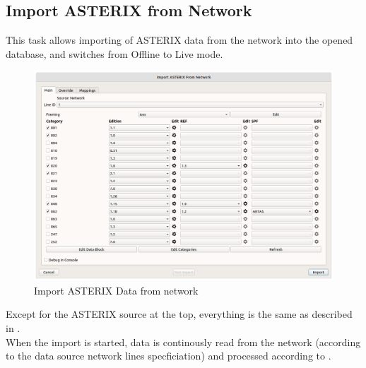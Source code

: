 \subsection{Import ASTERIX from Network}
\label{sec:ui_import_asterix_network}

This task allows importing of ASTERIX data from the network into the opened database, and switches from Offline to Live mode. \\

\begin{figure}[H]
  \center
    \hspace*{-0.5cm}
    \includegraphics[width=17cm]{figures/asterix_import_data_network.png}
  \caption{Import ASTERIX Data from network}
\end{figure}

Except for the ASTERIX source at the top, everything is the same as described in . \\

When the import is started, data is continously read from the network (according to the data source network lines specficiation) and processed according to .
